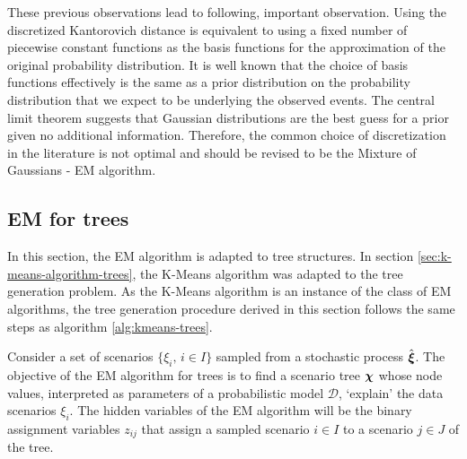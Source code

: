 These previous observations lead to following, important observation.
Using the discretized Kantorovich distance is equivalent to using a fixed number of piecewise constant functions as the basis functions for the approximation of the original probability distribution.
It is well known that the choice of basis functions effectively is the same as a prior distribution on the probability distribution that we expect to be underlying the observed events.
The central limit theorem suggests that Gaussian distributions are the best guess for a prior given no additional information.
Therefore, the common choice of discretization in the literature \cite{Dupacova2003} is not optimal and should be revised to be the Mixture of Gaussians - EM algorithm.

\subsection{EM for trees}
\label{sec:mixt-gauss-trees}
In this section, the EM algorithm is adapted to tree structures.
In section \ref{sec:k-means-algorithm-trees}, the K-Means algorithm was adapted to the tree generation problem.
As the K-Means algorithm is an instance of the class of EM algorithms, the tree generation procedure derived in this section follows the same steps as algorithm \ref{alg:kmeans-trees}.

Consider a set of scenarios $\{\xi_i,\, i\in I\}$ sampled from a stochastic process $\hat{\boldsymbol\xi}$.
The objective of the EM algorithm for trees is to find a scenario tree $\boldsymbol\chi$ whose node values, interpreted as parameters of a probabilistic model $\mathcal{D}$, `explain' the data scenarios $\xi_i$.
The hidden variables of the EM algorithm will be the binary assignment variables $z_{ij}$ that assign a sampled scenario $i\in I$ to a scenario $j\in J$ of the tree.

